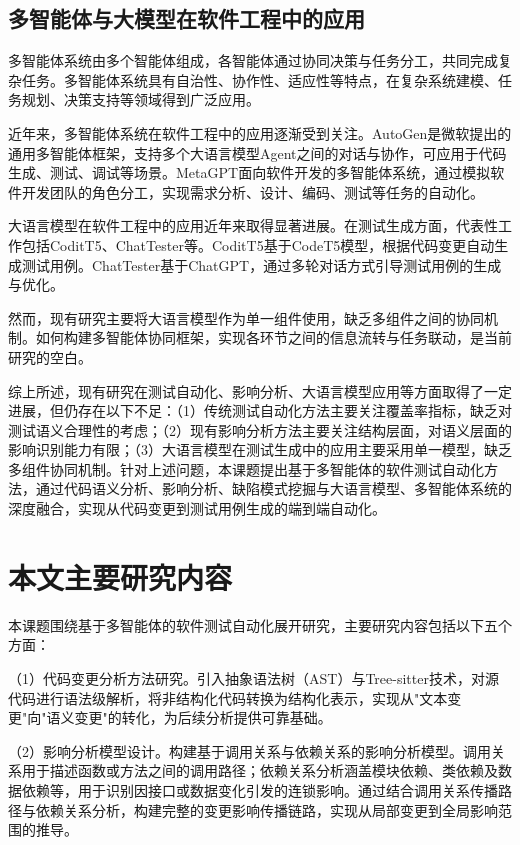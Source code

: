 \subsection{多智能体与大模型在软件工程中的应用}
多智能体系统由多个智能体组成，各智能体通过协同决策与任务分工，共同完成复杂任务。多智能体系统具有自治性、协作性、适应性等特点，在复杂系统建模、任务规划、决策支持等领域得到广泛应用。

近年来，多智能体系统在软件工程中的应用逐渐受到关注。AutoGen是微软提出的通用多智能体框架，支持多个大语言模型Agent之间的对话与协作，可应用于代码生成、测试、调试等场景\cite{Wu2023AutoGen}。MetaGPT面向软件开发的多智能体系统，通过模拟软件开发团队的角色分工，实现需求分析、设计、编码、测试等任务的自动化\cite{Hong2023MetaGPT}。

大语言模型在软件工程中的应用近年来取得显著进展。在测试生成方面，代表性工作包括CoditT5、ChatTester等\cite{Zhang2022CoditT5}。CoditT5基于CodeT5模型，根据代码变更自动生成测试用例。ChatTester基于ChatGPT，通过多轮对话方式引导测试用例的生成与优化。

然而，现有研究主要将大语言模型作为单一组件使用，缺乏多组件之间的协同机制。如何构建多智能体协同框架，实现各环节之间的信息流转与任务联动，是当前研究的空白。

综上所述，现有研究在测试自动化、影响分析、大语言模型应用等方面取得了一定进展，但仍存在以下不足：（1）传统测试自动化方法主要关注覆盖率指标，缺乏对测试语义合理性的考虑；（2）现有影响分析方法主要关注结构层面，对语义层面的影响识别能力有限；（3）大语言模型在测试生成中的应用主要采用单一模型，缺乏多组件协同机制。针对上述问题，本课题提出基于多智能体的软件测试自动化方法，通过代码语义分析、影响分析、缺陷模式挖掘与大语言模型、多智能体系统的深度融合，实现从代码变更到测试用例生成的端到端自动化。

\section{本文主要研究内容}
本课题围绕基于多智能体的软件测试自动化展开研究，主要研究内容包括以下五个方面：

（1）代码变更分析方法研究。引入抽象语法树（AST）与Tree-sitter技术，对源代码进行语法级解析，将非结构化代码转换为结构化表示，实现从"文本变更"向"语义变更"的转化，为后续分析提供可靠基础\cite{Kimmig2018TreeSitter}。

（2）影响分析模型设计。构建基于调用关系与依赖关系的影响分析模型。调用关系用于描述函数或方法之间的调用路径；依赖关系分析涵盖模块依赖、类依赖及数据依赖等，用于识别因接口或数据变化引发的连锁影响。通过结合调用关系传播路径与依赖关系分析，构建完整的变更影响传播链路，实现从局部变更到全局影响范围的推导\cite{Horwitz1990,Nielson2010Static}。

